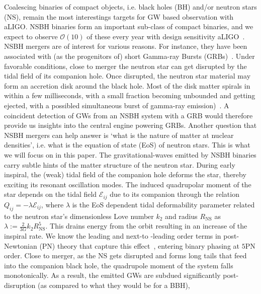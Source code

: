 \documentclass[aps,prd,amsmath,floats,floatfix, twocolumn,
superscriptaddress,nofootinbib,showpacs]{revtex4-1}
\begin{document}
Coalescing binaries of compact objects, i.e. black holes (BH) and/or neutron 
stars (NS), remain the most interestings targets for GW based observation with
aLIGO. NSBH binaries form an important sub-class of compact binaries, and we
expect to observe $\mathcal{O}(10)$ of these every year with design 
sensitivity aLIGO~\cite{Abadie:2010cf}.
% 
NSBH mergers are of interest for various reasons. For instance, they have 
been associated with (as the progenitors of) short Gamma-ray Bursts
(GRBs)~\cite{eichler:89,1992ApJ...395L..83N,moch:93,Barthelmy:2005bx,
2005Natur.437..845F,2005Natur.437..851G,Shibata:2005mz,Paschalidis2014,
Tanvir:2013}. Under favorable conditions, close to merger the neutron star
can get disrupted by the tidal field of its companion hole. Once disrupted,
the neutron star material may form an accretion disk around the black hole. 
Most of the disk matter spirals in within a few milliseconds, with a small 
fraction becoming unbounded and getting ejected, with a possibled simultaneous
burst of gamma-ray emission)~\cite{Foucart2015,Lovelace:2013vma,Deaton2013,
Foucart2012,Shibata:2005mz,Paschalidis2014}. A coincident detection of GWs
from an NSBH system with a GRB would therefore provide us insights into the
central engine powering GRBs. 
% 
Another question that NSBH mergers can help answer is `what is the 
nature of matter at nuclear densities', i.e. what is the equation of state
(EoS) of neutron stars. This is what we will focus on in this paper.
% 
The gravitational-waves emitted by NSBH binaries carry subtle hints of the 
matter structure of the neutron star. During early inspiral, the (weak) tidal
field of the companion hole deforms the star, thereby exciting its resonant
oscillation modes. The induced quadrupolar moment of the star depends on the
tidal field $\mathcal{E}_{ij}$ due to its companion through the relation
$Q_{ij} = -\lambda\mathcal{E}_{ij}$, where $\lambda$ is the EoS dependent
tidal deformability parameter related to the neutron star's dimensionless
Love number $k_2$ and radius $R_\mathrm{NS}$ as
$\lambda:=\frac{2}{3G}k_2 R_\mathrm{NS}^5$. This drains energy from the orbit
resulting in an increase of the inspiral rate. We know the leading and next-to
-leading order terms in post-Newtonian (PN) theory that capture this 
effect~\cite{Vines2011}, entering binary phasing at $5$PN order. Close to
merger, as the NS gets disrupted and forms long tails that feed into the 
companion black hole, the quadrupole moment of the system falls monotonically.
As a result, the emitted GWs are subdued significantly post-disruption
(as compared to what they would be for a BBH),
\end{document}
